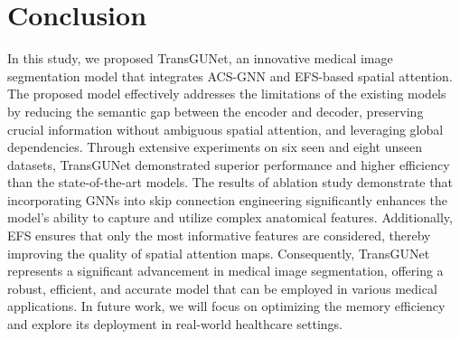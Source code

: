 \section{Conclusion}

In this study, we proposed TransGUNet, an innovative medical image segmentation model that integrates ACS-GNN and EFS-based spatial attention. The proposed model effectively addresses the limitations of the existing models by reducing the semantic gap between the encoder and decoder, preserving crucial information without ambiguous spatial attention, and leveraging global dependencies. Through extensive experiments on six seen and eight unseen datasets, TransGUNet demonstrated superior performance and higher efficiency than the state-of-the-art models. The results of ablation study demonstrate that incorporating GNNs into skip connection engineering significantly enhances the model's ability to capture and utilize complex anatomical features. Additionally, EFS ensures that only the most informative features are considered, thereby improving the quality of spatial attention maps. Consequently, TransGUNet represents a significant advancement in medical image segmentation, offering a robust, efficient, and accurate model that can be employed in various medical applications. In future work, we will focus on optimizing the memory efficiency and explore its deployment in real-world healthcare settings.
